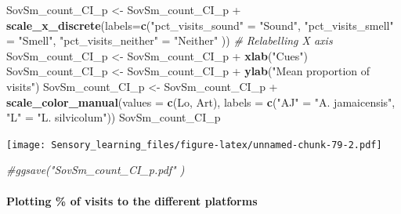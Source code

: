 \documentclass[]{article}
\newenvironment{Shaded}{\begin{snugshade}}{\end{snugshade}}
\newcommand{\KeywordTok}[1]{\textcolor[rgb]{0.13,0.29,0.53}{\textbf{{#1}}}}
\newcommand{\DataTypeTok}[1]{\textcolor[rgb]{0.13,0.29,0.53}{{#1}}}
\newcommand{\StringTok}[1]{\textcolor[rgb]{0.31,0.60,0.02}{{#1}}}
\newcommand{\CommentTok}[1]{\textcolor[rgb]{0.56,0.35,0.01}{\textit{{#1}}}}
\newcommand{\NormalTok}[1]{{#1}}
\let\oldparagraph\paragraph
\renewcommand{\paragraph}[1]{\oldparagraph{#1}\mbox{}}
\begin{document}
\begin{Shaded}
\begin{Highlighting}[]
\NormalTok{SovSm_count_CI_p <-}\StringTok{ }\NormalTok{SovSm_count_CI_p +}\StringTok{ }\KeywordTok{scale_x_discrete}\NormalTok{(}\DataTypeTok{labels=}\KeywordTok{c}\NormalTok{(}\StringTok{"pct_visits_sound"} \NormalTok{=}\StringTok{ "Sound"}\NormalTok{, }\StringTok{"pct_visits_smell"} \NormalTok{=}\StringTok{ "Smell"}\NormalTok{,}
                              \StringTok{"pct_visits_neither"} \NormalTok{=}\StringTok{ "Neither"} \NormalTok{))  }\CommentTok{# Relabelling X axis}
\NormalTok{SovSm_count_CI_p <-}\StringTok{ }\NormalTok{SovSm_count_CI_p +}\StringTok{ }\KeywordTok{xlab}\NormalTok{(}\StringTok{"Cues"}\NormalTok{)}
\NormalTok{SovSm_count_CI_p <-}\StringTok{ }\NormalTok{SovSm_count_CI_p +}\StringTok{ }\KeywordTok{ylab}\NormalTok{(}\StringTok{"Mean proportion of visits"}\NormalTok{)}
\NormalTok{SovSm_count_CI_p <-}\StringTok{ }\NormalTok{SovSm_count_CI_p +}\StringTok{  }\KeywordTok{scale_color_manual}\NormalTok{(}\DataTypeTok{values =} \KeywordTok{c}\NormalTok{(Lo, Art), }\DataTypeTok{labels =} \KeywordTok{c}\NormalTok{(}\StringTok{"AJ"} \NormalTok{=}\StringTok{ "A. jamaicensis"}\NormalTok{, }\StringTok{"L"} \NormalTok{=}\StringTok{ "L. silvicolum"}\NormalTok{))}
\NormalTok{SovSm_count_CI_p   }
\end{Highlighting}
\end{Shaded}

\texttt{[image: Sensory\_learning\_files/figure-latex/unnamed-chunk-79-2.pdf]}

\begin{Shaded}
\begin{Highlighting}[]
\CommentTok{#ggsave("SovSm_count_CI_p.pdf"  )}
\end{Highlighting}
\end{Shaded}

\paragraph{Plotting \% of visits to the different
platforms}\label{plotting-of-visits-to-the-different-platforms-1}
\end{document}
